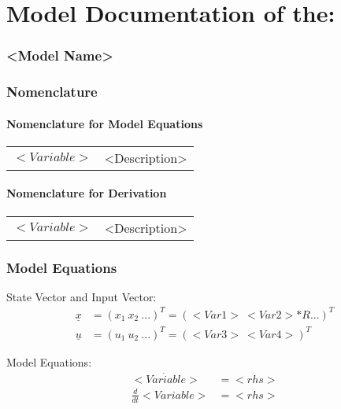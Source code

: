 \documentclass[10pt,a4paper]{article}
\begin{document}
	\part*{Model Documentation of the:}
	\section*{<Model Name>} %
	
	
	\section{Nomenclature} %
	\subsection{Nomenclature for Model Equations} %
	
	\begin{tabular}{ll}
		$<Variable>$ & <Description>		
	\end{tabular}
	
	\subsection{Nomenclature for Derivation} %
	
	\begin{tabular}{ll}
		$<Variable>$ & <Description>
	\end{tabular}
	
	
	\section{Model Equations} %
	
	State Vector and Input Vector:
	\begin{align*}
		\underline{x} &= (x_1 \ x_2 \ ...)^T = (<Var1> \ <Var2>*R ...)^T \\
		\underline{u} &= (u_1 \ u_2 \ ...)^T = (<Var3> \ <Var4>)^T
	\end{align*}

	\noindent Model Equations:		
	\begin{subequations}
	\begin{align}
		\dot{<Variable>} &= <rhs> 	\\      %
		\frac{d}{dt} <Variable> &= <rhs> 
	\end{align}
	\end{subequations}
\end{document}
